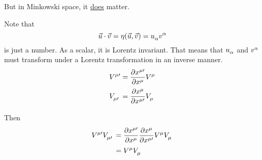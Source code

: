 \documentclass{article}
\begin{document}

\noindent But in Minkowski space, it \underline{does} matter.

\noindent Note that
\begin{equation*}
	\vec{u} \cdot \vec{v} = \eta ( \vec{u}, \vec{v} ) = \tensor{u}{_\alpha} \tensor{v}{^\alpha}
\end{equation*}
is just a number. As a scalar, it is Lorentz invariant. That means that $\tensor{u}{_\alpha}$ and $\tensor{v}{^\alpha}$ must transform under a Lorentz transformation in an inverse manner.
\begin{align*} %
	\tensor{V}{^\mu^\prime} &= \dfrac{ \partial \tensor{x}{^\mu^\prime} }{ \partial \tensor{x}{^\mu} } \tensor{V}{^\mu} \\
	\tensor{V}{_\mu_\prime} &= \dfrac{ \partial \tensor{x}{^\mu} }{ \partial \tensor{x}{^\mu^\prime} } \tensor{V}{_\mu} \\
\end{align*}

\noindent Then
\begin{align*}
	\tensor{V}{^\mu^\prime} \tensor{V}{_\mu_\prime} &= \dfrac{ \partial \tensor{x}{^\mu^\prime} }{ \partial \tensor{x}{^\mu} } \dfrac{ \partial \tensor{x}{^\mu} }{ \partial \tensor{x}{^\mu^\prime} } \tensor{V}{^\mu} \tensor{V}{_\mu} \\
	&= \tensor{V}{^\mu} \tensor{V}{_\mu}
\end{align*}
\end{document}
